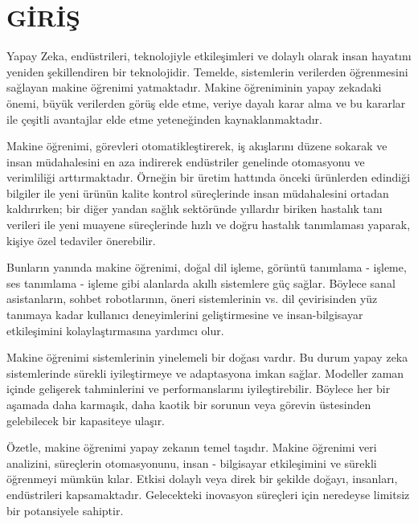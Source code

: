 \section{GİRİŞ}

Yapay Zeka, endüstrileri, teknolojiyle etkileşimleri ve dolaylı olarak insan hayatını yeniden şekillendiren bir teknolojidir. Temelde, sistemlerin verilerden öğrenmesini sağlayan makine öğrenimi yatmaktadır. Makine öğreniminin yapay zekadaki önemi, büyük verilerden görüş elde etme, veriye dayalı karar alma ve bu kararlar ile çeşitli avantajlar elde etme yeteneğinden kaynaklanmaktadır.

Makine öğrenimi, görevleri otomatikleştirerek, iş akışlarını düzene sokarak ve insan müdahalesini en aza indirerek endüstriler genelinde otomasyonu ve verimliliği arttırmaktadır. Örneğin bir üretim hattında önceki ürünlerden edindiği bilgiler ile yeni ürünün kalite kontrol süreçlerinde insan müdahalesini ortadan kaldırırken; bir diğer yandan sağlık sektöründe yıllardır biriken hastalık tanı verileri ile yeni muayene süreçlerinde hızlı ve doğru hastalık tanımlaması yaparak, kişiye özel tedaviler önerebilir.

Bunların yanında makine öğrenimi, doğal dil işleme, görüntü tanımlama - işleme, ses tanımlama - işleme gibi alanlarda akıllı sistemlere güç sağlar. Böylece sanal asistanların, sohbet robotlarının, öneri sistemlerinin vs. dil çevirisinden yüz tanımaya kadar kullanıcı deneyimlerini geliştirmesine ve insan-bilgisayar etkileşimini kolaylaştırmasına yardımcı olur.

Makine öğrenimi sistemlerinin yinelemeli bir doğası vardır. Bu durum yapay zeka sistemlerinde sürekli iyileştirmeye ve adaptasyona imkan sağlar. Modeller zaman içinde gelişerek tahminlerini ve performanslarını iyileştirebilir. Böylece her bir aşamada daha karmaşık, daha kaotik bir sorunun veya görevin üstesinden gelebilecek bir kapasiteye ulaşır.

Özetle, makine öğrenimi yapay zekanın temel taşıdır. Makine öğrenimi veri analizini, süreçlerin otomasyonunu, insan - bilgisayar etkileşimini ve sürekli öğrenmeyi mümkün kılar. Etkisi dolaylı veya direk bir şekilde doğayı, insanları, endüstrileri kapsamaktadır. Gelecekteki inovasyon süreçleri için neredeyse limitsiz bir potansiyele sahiptir.